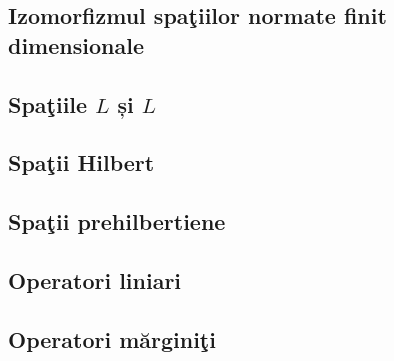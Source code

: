 \documentclass[a4paper,12pt]{article}
\theoremstyle{change}
\begin{document}
\subsection{Izomorfizmul spaţiilor normate finit dimensionale}

\subsection{Spaţiile $L$ și $L$}


\subsection{Spaţii  Hilbert}

\subsection{Spaţii prehilbertiene}


\subsection{Operatori liniari}

\subsection{Operatori mărginiţi}


\end{document}
